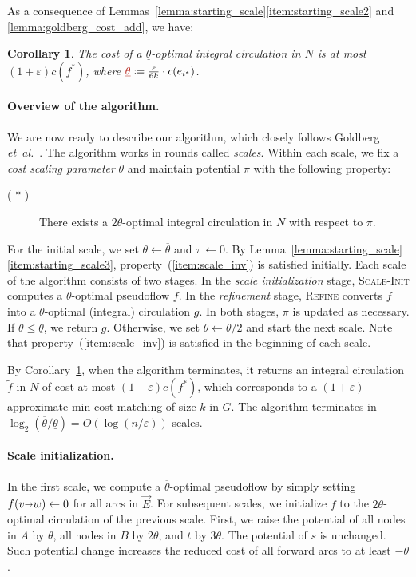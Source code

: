 \documentclass[11pt]{article}
\makeatletter
\def\etal{\emph{et~al.}}
\def\etal{\textit{et~al.}}
\def\eps{\varepsilon}
\def\arcto{\mathord\shortrightarrow}
\def\arc#1#2{#1\arcto#2}
\def\cost{c}
\newtheorem{corollary}[lemma]{Corollary}
\numberwithin{figure}{section}
\def\EMPH#1{\textcolor{BrickRed}{{\emph{#1}}}}
\def\namedlabel#1#2{\begingroup
    #2%
    \def\@currentlabel{#2}%
    \phantomsection\label{#1}\endgroup
}
\makeatother
\begin{document}
As a consequence of Lemmas~\ref{lemma:starting_scale}\ref{item:starting_scale2}
and \ref{lemma:goldberg_cost_add}, we have:
%
\begin{corollary}
\label{corollary:goldberg_approx}
The cost of a $\underline{\theta}$-optimal integral circulation in $N$ is at
most $(1+\eps) \cost(f^*)$,
where $\EMPH{$\underline{\theta}$} \coloneqq \frac{\eps}{6k} \cdot c(e_{i^*})$.
\end{corollary}

\paragraph*{Overview of the algorithm.}
We are now ready to describe our algorithm, which closely follows Goldberg \etal~\cite{GHKT17}.
The algorithm works in rounds called \EMPH{scales}.
Within each scale, we fix a \EMPH{cost scaling parameter}
\EMPH{$\theta$} and maintain potential $\pi$ with the following property:

\begin{description}
\item[(\namedlabel{item:scale_inv}{$\ast$})]
	There exists a $2\theta$-optimal integral circulation in $N$ with respect to $\pi$.
\end{description}

For the initial scale, we set $\theta \gets \overline{\theta}$ and $\pi \gets 0$.
By Lemma~\ref{lemma:starting_scale}\ref{item:starting_scale3},
property~(\ref{item:scale_inv}) is satisfied initially.
Each scale of the algorithm consists of two stages.
In the \EMPH{scale initialization} stage, \textsc{Scale-Init}
computes a $\theta$-optimal pseudoflow $f$.
In the \EMPH{refinement} stage, \textsc{Refine} converts $f$ into
a $\theta$-optimal (integral) circulation $g$.
In both stages, $\pi$ is updated as necessary.
If $\theta \leq \underline{\theta}$, we return $g$.
Otherwise, we set $\theta \gets \theta/2$ and start the next scale.
Note that property~(\ref{item:scale_inv}) is satisfied in the beginning of each scale.

By Corollary~\ref{corollary:goldberg_approx}, when the algorithm terminates,
it returns an integral circulation $\tilde{f}$ in $N$ of cost at most
$(1+\eps) \cost(f^*)$, which corresponds to a $(1+\eps)$-approximate min-cost
matching of size $k$ in $G$.
The algorithm terminates in
$\log_2(\overline{\theta}/\underline{\theta}) = O(\log(n/\eps))$ scales.


\paragraph*{Scale initialization.}
In the first scale, we compute a $\overline{\theta}$-optimal pseudoflow by
simply setting $f(\arc vw) \gets 0$ for all arcs in $\vec{E}$.
For subsequent scales, we initialize $f$ to the $2\theta$-optimal circulation of the previous scale.
First, we raise the potential of all nodes in $A$ by $\theta$, all nodes in $B$ by $2\theta$,
and $t$ by $3\theta$.
The potential of $s$ is unchanged.
%
Such potential change increases the reduced cost of all forward arcs to at least
$-\theta$.
\end{document}
